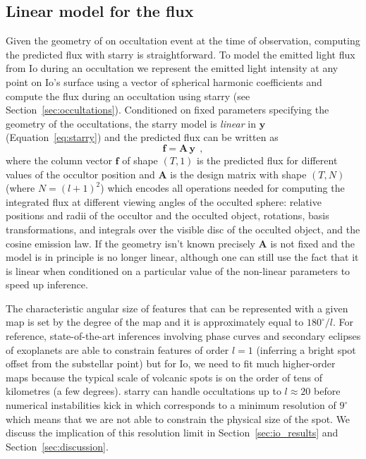 \documentclass[12pt,dvipsnames]{report}
\newcommand{\ssf}[1]{\textsf{#1}}
\renewcommand{\vec}[1]{\boldsymbol{\mathbf{#1}}}
\newcommand{\hquad}{~~}
\begin{document}
\subsection{Linear model for the flux}
\label{ssec:model_spec}
Given the geometry of on occultation event at the time of observation, 
computing the predicted flux with \textsf{starry} is straightforward.
To model the emitted light flux from Io during an occultation we represent the emitted 
light intensity at any point on Io's surface using a vector of spherical harmonic 
coefficients and compute the flux during an occultation using \ssf{starry}
(see Section~\ref{sec:occultations}). 
Conditioned on fixed parameters specifying the geometry of the occultations, the 
\textsf{starry} model is \emph{linear} in $\vec{y}$ (Equation~\ref{eq:starry}) and 
the predicted flux can be written as 
\begin{equation}
    \mathbf{f}=\mathbf{A}\,\mathbf{y}
    \hquad,
    \label{eq:starry_linear_model}
\end{equation}
where the column vector $\mathbf{f}$ of shape $(T, 1)$ is the predicted flux for 
different values of the occultor position and $\mathbf{A}$ is the design matrix 
\citep[see appendix B.1. in ][]{2021AJ....162..123L} with shape $(T, N)$ (where
$N=(l+1)^2$) which encodes all operations needed for computing the integrated flux at 
different viewing angles of the occulted sphere: relative positions and radii of the 
occultor and the occulted object, rotations, basis transformations, and integrals over the 
visible disc of the occulted object, and the cosine emission law.
If the geometry isn't known precisely $\mathbf{A}$ is not fixed and the model is in 
principle is no longer linear, although one can still use the fact that it is linear when 
conditioned on a particular value of the non-linear parameters to speed up inference.

The characteristic angular size of features that can be represented with a given map 
is set by the degree of the map and it is approximately equal to $180^\circ/l$.
For reference, state-of-the-art inferences involving phase curves and secondary eclipses of exoplanets are able to constrain features of order $l=1$ (inferring a bright spot offset from the substellar point) but for Io, we need to fit much higher-order maps because the typical scale of volcanic spots is on the order of tens of kilometres (a few degrees).
\textsf{starry} can handle occultations up to $l\approx 20$ before numerical 
instabilities kick in \citep{2019AJ....157...64L} which corresponds to a minimum 
resolution of $9^\circ$ which means that we are not able to constrain the physical 
size of the spot.
We discuss the implication of this resolution limit in Section~\ref{sec:io_results} and Section~\ref{sec:discussion}.
\end{document}
